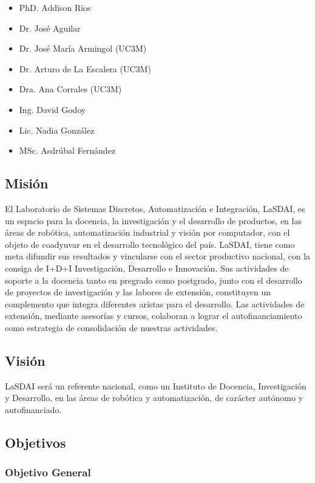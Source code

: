 \begin{itemize}
	\itemsep1pt \parskip0pt 
	\item PhD. Addison Rios
	\item Dr. José Aguilar
	\item Dr. José María Armingol (UC3M)
	\item Dr. Arturo de La Escalera (UC3M)
	\item Dra. Ana Corrales (UC3M)
	\item Ing. David Godoy
	\item Lic. Nadia González
	\item MSc. Asdrúbal Fernández
\end{itemize}

\subsection{Misión}

El Laboratorio de Sistemas Discretos, Automatización e Integración, LaSDAI, es un espacio para la docencia, la investigación y el desarrollo de productos, en las áreas de robótica, automatización industrial y visión por computador, con el objeto de coadyuvar en el desarrollo tecnológico del país.
LaSDAI, tiene como meta difundir sus resultados  y vincularse con el sector productivo nacional, con la consiga de I+D+I Investigación, Desarrollo e Innovación. Sus actividades de soporte a la docencia tanto en pregrado como postgrado, junto con el desarrollo de proyectos de investigación y las labores de extensión, constituyen un complemento que integra diferentes aristas para el desarrollo. Las actividades de extensión, mediante asesorías y cursos, colaboran a lograr el autofinanciamiento como estrategia de consolidación de nuestras actividades.

\subsection{Visión}

LaSDAI será un referente nacional, como un Instituto de Docencia, Investigación y Desarrollo, en las áreas de robótica y automatización, de carácter autónomo y autofinanciado.

\subsection{Objetivos}

\subsubsection{Objetivo General}

